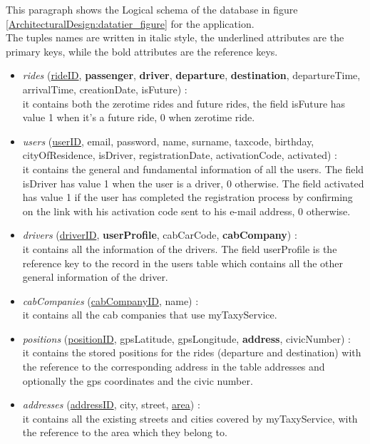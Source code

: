 \documentclass[\mainpath/main]{subfiles}
\begin{document}
This paragraph shows the Logical schema of the database in figure \ref{ArchitecturalDesign:datatier_figure} for the application.\\
The tuples names are written in italic style, the underlined attributes are the primary keys, while the
bold attributes are the reference keys.\\
\begin{itemize}
	\item \textit{rides} (\underline{rideID}, \textbf{passenger}, \textbf{driver}, \textbf{departure}, \textbf{destination}, departureTime, arrivalTime, creationDate, isFuture) : \\
	it contains both the zerotime rides and future rides, the field isFuture has value 1 when it's a future ride, 0 when zerotime ride.
	
	\item \textit{users} (\underline{userID}, email, password, name, surname, taxcode, birthday, cityOfResidence, isDriver, registrationDate, activationCode, activated) : \\
	it contains the general and fundamental information of all the users. The field isDriver has value 1 when the user is a driver, 0 otherwise. The field activated has value 1 if the user has completed the registration process by confirming on the link with his activation code sent to his e-mail address, 0 otherwise.
	
	\item \textit{drivers} (\underline{driverID}, \textbf{userProfile}, cabCarCode, \textbf{cabCompany}) : \\
	it contains all the information of the drivers. The field userProfile is the reference key to the record in the users table which contains all the other general information of the driver.
	
	\item \textit{cabCompanies} (\underline{cabCompanyID}, name) : \\
	it contains all the cab companies that use myTaxyService.
	
	\item \textit{positions} (\underline{positionID}, gpsLatitude, gpsLongitude, \textbf{address}, civicNumber) : \\
	it contains the stored positions for the rides (departure and destination) with the reference to the corresponding address in the table addresses and optionally the gps coordinates and the civic number.
	
	\item \textit{addresses} (\underline{addressID}, city, street, \underline{area}) : \\
	it contains all the existing streets and cities covered by myTaxyService, with the reference to the area which they belong to.
	

\end{itemize}
\end{document}
